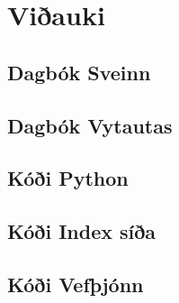 \section{Viðauki}
\begingroup
\obeylines
\subsection{Dagbók Sveinn}
 \cite{cite3} \cite{cite4} \cite{cite6}
\subsection{Dagbók Vytautas}
 \cite{cite1} \cite{cite2} \cite{cite5} 
\endgroup
\subsection{Kóði Python}
\begingroup
 \cite{cite6}
\subsection{Kóði Index síða}
\begingroup

\subsection{Kóði Vefþjónn}
\begingroup

\endgroup